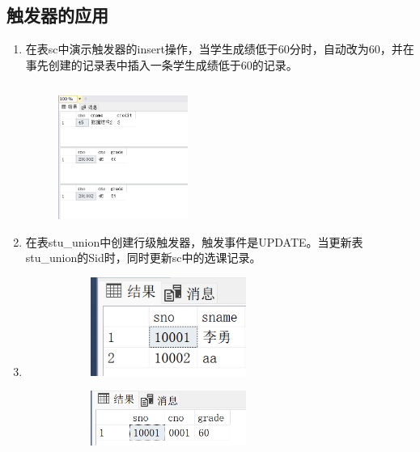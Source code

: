 \documentclass[a4paper,twoside]{article}
\begin{document}
\begin{spacing}{1.2}
\section{触发器的应用}

\begin{enumerate}
\item 在表sc中演示触发器的insert操作，当学生成绩低于60分时，自动改为60，并在事先创建的记录表中插入一条学生成绩低于60的记录。
\inputminted[firstline=1,lastline=30]{sql}{../code/3.sql}
\begin{figure}[H]
  \centering
  \includegraphics[width=0.4\textwidth]{11.png}
\end{figure}
\item 在表stu\_union中创建行级触发器，触发事件是UPDATE。当更新表stu\_union的Sid时，同时更新sc中的选课记录。
\item \begin{figure}[H]
  \centering
  \caption{修改前}
  \begin{subfigure}{0.45\textwidth}
  \includegraphics[width=0.6\textwidth]{133-1.png}
  \end{subfigure}
  \begin{subfigure}{0.45\textwidth}
    \includegraphics[width=0.6\textwidth]{133-2.png}

\end{subfigure}
\end{figure}
\end{enumerate}
\end{spacing}
\end{document}

